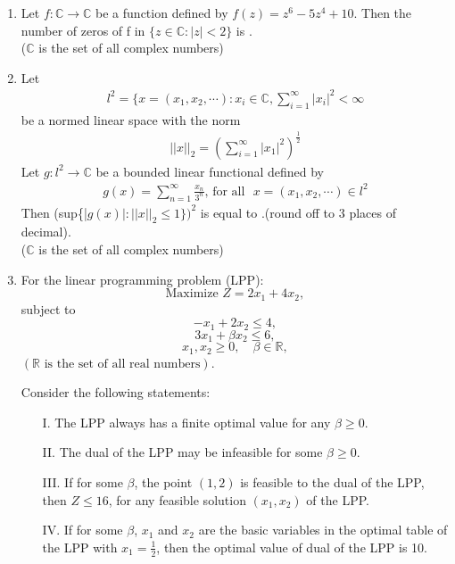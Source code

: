 \documentclass[journal]{IEEEtran}
\begin{document}
\begin{enumerate}
\item Let $f:\mathbb{C}\rightarrow \mathbb{C}$ be a function defined by $f(z)=z^6-5z^4+10$. Then the number of zeros of f in $\{z\in \mathbb{C}:|z|<2\}$ is \underline{\hspace{1cm}}.\\ ($\mathbb{C}$ is the set of all complex numbers)
\vspace{0.5cm}
\item Let 
\begin{align*}
    l^2=\{x=(x_1,x_2,\cdots):x_i\in\mathbb{C},\sum_{i=1}^\infty|x_i|^2<\infty
\end{align*}
be a normed linear space with the norm
\begin{align*}
    ||x||_{2}=(\sum_{i=1}^\infty|x_1|^2)^{\frac{1}{2}}
\end{align*}
Let $g:l^2\rightarrow \mathbb{C}$ be a bounded linear functional defined by 
\begin{align*}
    g(x)=\sum_{n=1}^\infty\frac{x_n}{3^n}\text{, } \text{for all}\text{ } x=(x_1,x_2,\cdots)\in l^2
\end{align*}
Then (sup\{|$g(x)|:||x||_2\leq1\})^2$ is equal to \underline{\hspace{1cm}}.(round off to 3 places of decimal).\\($\mathbb{C}$ is the set of all complex numbers)
\vspace{0.5cm}
\item For the linear programming problem (LPP): 
\[
\text{Maximize } Z = 2x_1 + 4x_2,
\]
subject to
\[
- x_1 + 2x_2 \leq 4,
\]
\[
3x_1 + \beta x_2 \leq 6,
\]
\[
x_1, x_2 \geq 0, \quad \beta \in \mathbb{R},
\]
\((\mathbb{R} \text{ is the set of all real numbers})\).

Consider the following statements:

\begin{itemize}
    \item[I.] The LPP always has a finite optimal value for any \( \beta \geq 0 \).
    \item[II.] The dual of the LPP may be infeasible for some \( \beta \geq 0 \).
    \item[III.] If for some \( \beta \), the point \( (1,2) \) is feasible to the dual of the LPP, then \( Z \leq 16 \), for any feasible solution \( (x_1, x_2) \) of the LPP.
    \item[IV.] If for some \( \beta \), \( x_1 \) and \( x_2 \) are the basic variables in the optimal table of the LPP with \( x_1 = \frac{1}{2} \), then the optimal value of dual of the LPP is 10.
\end{itemize}


\end{enumerate}
\end{document}
